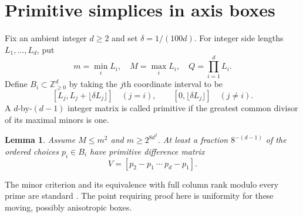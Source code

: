\documentclass[11pt,a4paper]{article}
\newtheorem{lemma}[theorem]{Lemma}
\theoremstyle{remark}
\newcommand{\Z}{\mathbb Z}
\newcommand{\Nzero}{\Z_{\geq0}}
\newcommand{\floor}[1]{\lfloor#1\rfloor}
\newcommand{\dd}{\delta}
\begin{document}
\section{Primitive simplices in axis boxes}
Fix an ambient integer \(d\geq2\) and set \(\dd=1/(100d)\).
For integer side lengths \(L_1,\ldots,L_d\), put
\[
 m=\min_i L_i,\quad M=\max_i L_i,\quad Q=\prod_{i=1}^{d}L_i.
\]
Define \(B_i\subset\Nzero^d\) by taking the \(j\)th coordinate interval to be
\[
 [L_j,L_j+\floor{\dd L_j}]\quad(j=i),\qquad
 [0,\floor{\dd L_j}]\quad(j\ne i).
\]
A \(d\)-by-\((d-1)\) integer matrix is called primitive if the greatest
common divisor of its maximal minors is one.

\begin{lemma}\label{lem:primitive}
Assume \(M\leq m^2\) and \(m\geq2^{8d^2}\).
At least a fraction \(8^{-(d-1)}\) of the ordered choices
\(p_i\in B_i\) have primitive difference matrix
\[
 V=[p_2-p_1\ \cdots\ p_d-p_1].
\]
\end{lemma}
The minor criterion and its equivalence with full column rank modulo
every prime are standard \cite[Propositions 3--4]{MW}.
The point requiring proof here is uniformity for these moving,
possibly anisotropic boxes.
\end{document}

